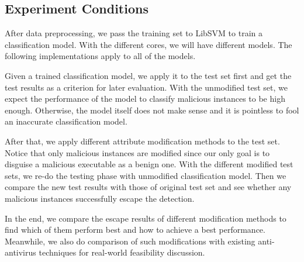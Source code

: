 \documentclass[11pt]{article}
\begin{document}


\subsection{Experiment Conditions}
After data preprocessing, we pass the training set to LibSVM to train a classification model. With the different cores, we will have different models. The following implementations apply to all of the models.

Given a trained classification model, we apply it to the test set first and get the test results as a criterion for later evaluation. With the unmodified test set, we expect the performance of the model to classify malicious instances to be high enough. Otherwise, the model itself does not make sense and it is pointless to fool an inaccurate classification model.

After that, we apply different attribute modification methods to the test set. Notice that only malicious instances are modified since our only goal is to disguise a malicious executable as a benign one. With the different modified test sets, we re-do the testing phase with unmodified classification model. Then we compare the new test results with those of original test set and see whether any malicious instances successfully escape the detection.

In the end, we compare the escape results of different modification methods to find which of them perform best and how to achieve a best performance. Meanwhile, we also do comparison of such modifications with existing anti-antivirus techniques for real-world feasibility discussion.

\end{document}
